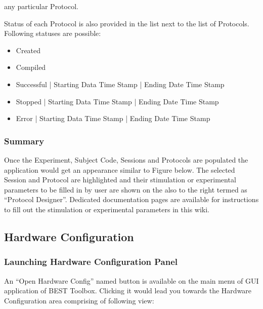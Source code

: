 \documentclass[letterpaper,10pt,english]{sphinxmanual}
\begin{document}
\sphinxAtStartPar
any particular Protocol.

\sphinxAtStartPar
Status of each Protocol is also provided in the list next to the list of Protocols. Following statuses are possible:
\begin{itemize}
\item {} 
\sphinxAtStartPar
Created

\item {} 
\sphinxAtStartPar
Compiled

\item {} 
\sphinxAtStartPar
Successful | Starting Data Time Stamp | Ending Date Time Stamp

\item {} 
\sphinxAtStartPar
Stopped | Starting Data Time Stamp | Ending Date Time Stamp

\item {} 
\sphinxAtStartPar
Error | Starting Data Time Stamp | Ending Date Time Stamp

\end{itemize}


\subsubsection{Summary}
\label{\detokenize{4_DesignExperiment:summary}}
\sphinxAtStartPar
Once the Experiment, Subject Code, Sessions and Protocols are populated the application would get an appearance similar to Figure below. The selected Session and Protocol are highlighted and their stimulation or experimental parameters to be filled in by user are shown on the also to the right termed as “Protocol Designer”. Dedicated documentation pages are available for instructions to fill out the stimulation or experimental parameters in this wiki.

\begin{figure}[htbp]
\centering

\noindent{}
\end{figure}


\subsection{Hardware Configuration}
\label{\detokenize{5_HardwareConfiguration:hardware-configuration}}\label{\detokenize{5_HardwareConfiguration::doc}}

\subsubsection{Launching Hardware Configuration Panel}
\label{\detokenize{5_HardwareConfiguration:launching-hardware-configuration-panel}}
\sphinxAtStartPar
An “Open Hardware Config” named button is available on the main menu of GUI application of BEST Toolbox. Clicking it would lead you towards the Hardware Configuration area comprising of following view:
\end{document}
